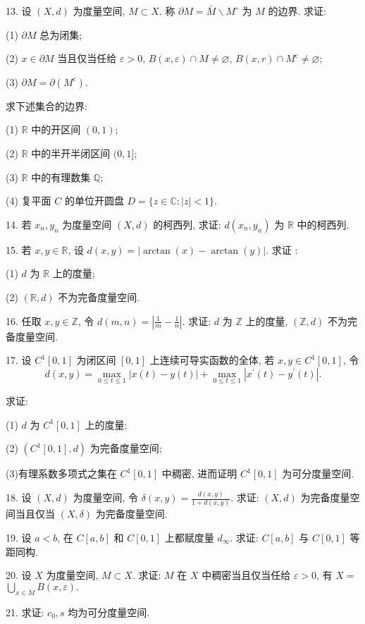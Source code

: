 \documentclass[openany]{ctexbook}
\theoremstyle{kaiti}
\theoremstyle{normal}
\begin{document}
13. 设 $(X, d)$ 为度量空间, $M \subset X$. 称 $\partial M=\bar{M} \backslash M^{\circ}$ 为 $M$ 的边界. 求证:

(1) $\partial M$ 总为闭集;

(2) $x \in \partial M$ 当且仅当任给 $\varepsilon>0$, $B(x, \varepsilon) \cap M \neq \varnothing$, $B(x, r) \cap M^{\mathrm{c}} \neq \varnothing$;

(3) $\partial M=\partial\left(M^{\mathrm{c}}\right)$.

求下述集合的边界:

(1) $\mathbb{R}$ 中的开区间 $(0,1)$;

(2) $\mathbb{R}$ 中的半开半闭区间 $(0,1]$;

(3) $\mathbb{R}$ 中的有理数集 $\mathbb{Q}$;

(4) 复平面 $C$ 的单位开圆盘 $D=\{z \in \mathbb{C}:|z|<1\}$.

14. 若 $x_n, y_n$ 为度量空间 $(X, d)$ 的柯西列, 求证: $d\left(x_n, y_n\right)$ 为 $\mathbb{R}$ 中的柯西列.

15. 若 $x, y \in \mathbb{R}$, 设 $d(x, y)=|\arctan (x)-\arctan (y)|$. 求证 :

(1) $d$ 为 $\mathbb{R}$ 上的度量;

(2) $(\mathbb{R}, d)$ 不为完备度量空间.

16. 任取 $x, y \in \mathbb{Z}$, 令 $d(m, n)=\left|\frac{1}{m}-\frac{1}{n}\right|$. 求证: $d$ 为 $\mathbb{Z}$ 上的度量, $(\mathbb{Z}, d)$ 不为完备度量空间.

17. 设 $C^1[0,1]$ 为闭区间 $[0,1]$ 上连续可导实函数的全体, 若 $x, y \in C^1[0,1]$, 令
$$
d(x, y)=\max_{0 \leq t \leq 1}|x(t)-y(t)|+\max_{0 \leq t \leq 1}\left|x^{\prime}(t)-y^{\prime}(t)\right|.
$$

求证:

(1) $d$ 为 $C^1[0,1]$ 上的度量;

(2) $\left(C^1[0,1], d\right)$ 为完备度量空间;

(3)有理系数多项式之集在 $C^1[0,1]$ 中稠密, 进而证明 $C^1[0,1]$ 为可分度量空间.

18. 设 $(X, d)$ 为度量空间, 令 $\delta(x, y)=\frac{d(x, y)}{1+d(x, y)}$. 求证: $(X, d)$ 为完备度量空间当且仅当 $(X, \delta)$ 为完备度量空间.

19. 设 $a<b$, 在 $C[a, b]$ 和 $C[0,1]$ 上都赋度量 $d_{\infty}$. 求证: $C[a, b]$ 与 $C[0,1]$ 等距同构.

20. 设 $X$ 为度量空间, $M \subset X$. 求证: $M$ 在 $X$ 中稠密当且仅当任给 $\varepsilon>0$, 有 $X=$ $\bigcup_{x \in M} B(x, \varepsilon).$

21. 求证: $c_0, s$ 均为可分度量空间.
\end{document}
